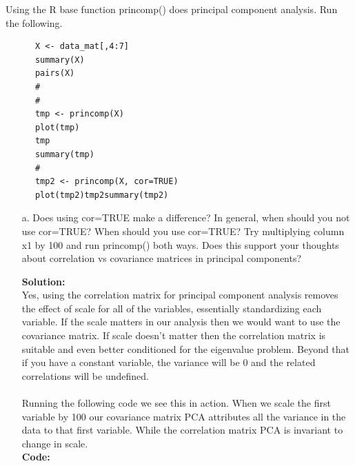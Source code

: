 \documentclass[12pt]{article}
\makeatletter
\theoremstyle{homework}
\newenvironment{exercise}[1]
{\def\@currentlabel{#1}\exercisecore}
{\endexercisecore}
\newcommand{\localhead}[1]{\par\smallskip\noindent\textbf{#1}\nobreak\\}%
\newcommand\solution{\localhead{Solution:}}
\makeatother
\begin{document}
\begin{exercise}{3} Using the R base function princomp() does principal component analysis. Run the following.\\
  \begin{footnotesize}
    \begin{verbatim}
      X <- data_mat[,4:7]
      summary(X)
      pairs(X)
      #
      #
      tmp <- princomp(X) 
      plot(tmp)
      tmp
      summary(tmp)
      #
      tmp2 <- princomp(X, cor=TRUE)
      plot(tmp2)tmp2summary(tmp2)
    \end{verbatim}
  \end{footnotesize}
  \begin{enumerate}
    \item[a.] Does using cor=TRUE make a difference? In general, when should you not use cor=TRUE? When should you use cor=TRUE? Try 
    multiplying column x1 by 100 and run princomp() both ways. Does this support your thoughts about correlation vs covariance matrices in principal components?\\
    \solution Yes, using the correlation matrix for principal component analysis removes the effect of scale for all of the variables, essentially standardizing each variable. 
    If the scale matters in our analysis then we would want to use the covariance matrix. If scale doesn't matter then the correlation matrix is suitable and even better conditioned for 
    the eigenvalue problem. Beyond that if you have a constant variable, the variance will be 0 and the related correlations will be undefined.\\\\
    Running the following code we see this in action. When we scale the first variable by 100 our covariance matrix PCA attributes all the variance in the data to that first variable. While the 
    correlation matrix PCA is invariant to change in scale.\\
    \textbf{Code:}
    \begin{center}
    
    \end{center} 
    \vspace{.15in}


\end{enumerate}
\end{exercise}
\end{document}
